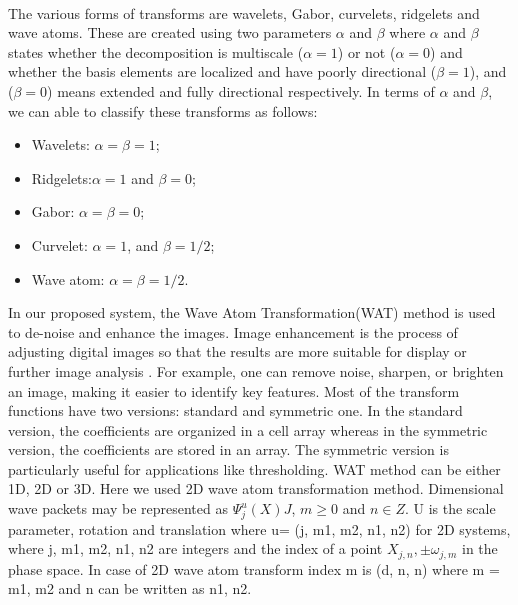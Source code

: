\paragraph{}
The various forms of transforms are wavelets, Gabor, curvelets, ridgelets and wave atoms. These are created using two parameters $\alpha$ and $\beta$ where $\alpha$ and $\beta$ states whether the decomposition is multiscale ($\alpha =1$) or not ($\alpha=0$) and whether the basis elements are localized and  have poorly directional ($\beta =1$), and ($\beta=0$) means extended and fully directional respectively. In terms of $\alpha$ and $\beta$, we can able to classify these transforms as follows:
\begin{itemize}
\item Wavelets: $\alpha=\beta=1$; 
\item Ridgelets:$\alpha=1$ and $\beta=0$;
\item Gabor: $\alpha=\beta=0$; 
\item Curvelet: $\alpha=1$, and $\beta=1/2$;
\item Wave atom: $\alpha=\beta=1/2$.
\end{itemize}
In our proposed system, the Wave Atom Transformation(WAT) method is used to de-noise and enhance the images. 
Image enhancement is the process of adjusting digital images so that the results are more suitable for display or further image analysis \cite{21}. For example, one can remove noise, sharpen, or brighten an image, making it easier to identify key features. Most of the transform functions have two versions: standard and symmetric one. In the standard version, the coefficients are organized in a cell array whereas in the symmetric version, the coefficients are stored in an array. The symmetric version is particularly useful for applications like thresholding. WAT method can be either 1D, 2D or 3D. Here we used 2D wave atom transformation method. Dimensional wave packets may be
represented as $\Psi_{j}^{u} (X)J$, $m\geq 0$  and $n\in Z$. 
U is the scale parameter, rotation and translation where u= (j, m1, m2, n1, n2) for 2D systems, where j, m1, m2, n1, n2 are integers and the index of a point $X_{j,n},  \pm \omega_{j,m}$ in the phase space. In case of 2D wave atom transform index m is (d, n, n) where m = m1, m2 and n can be written as n1, n2.

